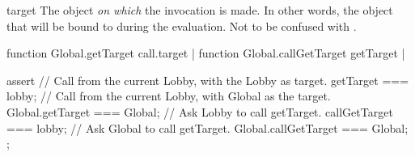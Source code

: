 \begin{urbiscriptapi}
\item[target]%
  The object \emph{on which} the invocation is made.  In other words, the
  object that will be bound to \this during the evaluation.  Not to be
  confused with .
\begin{urbiscript}
function Global.getTarget { call.target } |
function Global.callGetTarget { getTarget } |

assert
{
  // Call from the current Lobby, with the Lobby as target.
  getTarget === lobby;
  // Call from the current Lobby, with Global as the target.
  Global.getTarget === Global;
  // Ask Lobby to call getTarget.
  callGetTarget === lobby;
  // Ask Global to call getTarget.
  Global.callGetTarget === Global;
};
\end{urbiscript}

\end{urbiscriptapi}


